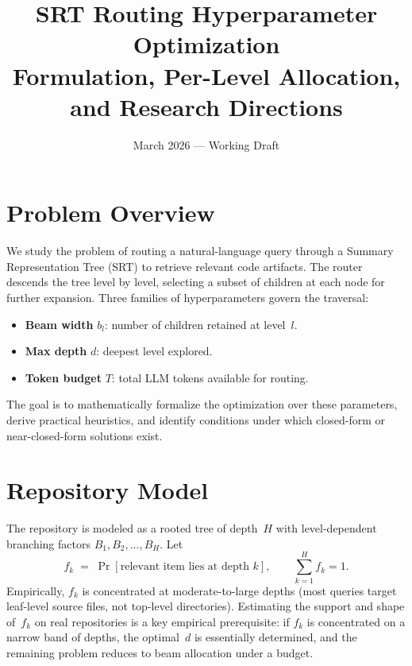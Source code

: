 \documentclass[11pt]{article}
\title{SRT Routing Hyperparameter Optimization\\[4pt]
\large Formulation, Per-Level Allocation, and Research Directions}
\author{}
\date{March 2026 --- Working Draft}
\theoremstyle{plain}
\begin{document}
\maketitle

\section{Problem Overview}

We study the problem of routing a natural-language query through a
Summary Representation Tree (SRT) to retrieve relevant code artifacts.
The router descends the tree level by level, selecting a subset of
children at each node for further expansion.  Three families of
hyperparameters govern the traversal:

\begin{itemize}[nosep]
  \item \textbf{Beam width} $b_l$: number of children retained at level~$l$.
  \item \textbf{Max depth} $d$: deepest level explored.
  \item \textbf{Token budget} $T$: total LLM tokens available for routing.
\end{itemize}

\noindent
The goal is to mathematically formalize the optimization over these
parameters, derive practical heuristics, and identify conditions under
which closed-form or near-closed-form solutions exist.

\section{Repository Model}

The repository is modeled as a rooted tree of depth~$H$ with
level-dependent branching factors $B_1, B_2, \ldots, B_H$.
Let
\[
  f_k \;=\; \Pr[\text{relevant item lies at depth } k],
  \qquad \sum_{k=1}^{H} f_k = 1.
\]
Empirically, $f_k$ is concentrated at moderate-to-large depths (most
queries target leaf-level source files, not top-level directories).
Estimating the support and shape of~$f_k$ on real repositories is a
key empirical prerequisite: if $f_k$ is concentrated on a narrow band
of depths, the optimal~$d$ is essentially determined, and the
remaining problem reduces to beam allocation under a budget.
\end{document}
